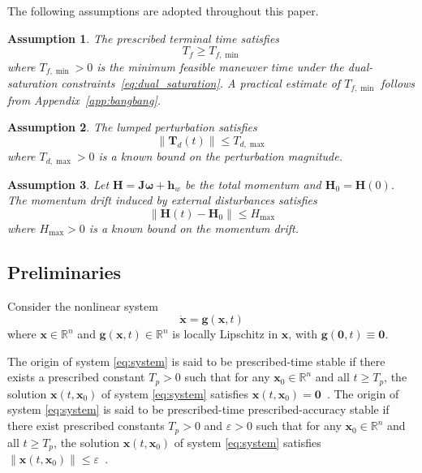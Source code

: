 \documentclass[journal]{new-aiaa}
\newtheorem{assumption}{Assumption}
\begin{document}
The following assumptions are adopted throughout this paper.

\begin{assumption}\label{ass:feasible_Tf}
The prescribed terminal time satisfies
\begin{equation}
T_f \ge T_{f,\min}
\label{eq:T_f_feasible}
\end{equation}
where $T_{f,\min}>0$ is the minimum feasible maneuver time under the dual-saturation constraints~\eqref{eq:dual_saturation}.
A practical estimate of $T_{f,\min}$ follows from Appendix~\ref{app:bangbang}.
\end{assumption}

\begin{assumption}\label{ass:disturbance_bound}
The lumped perturbation satisfies
\begin{equation}
\|\boldsymbol{T}_d(t)\| \le T_{d,\max}
\label{eq:Td_bound}
\end{equation}
where $T_{d,\max}>0$ is a known bound on the perturbation magnitude.
\end{assumption}

\begin{assumption}\label{ass:H_budget}
Let $\boldsymbol{H}=\boldsymbol{J}\boldsymbol{\omega}+\boldsymbol{h}_w$ be the total momentum and $\boldsymbol{H}_0=\boldsymbol{H}(0)$.
The momentum drift induced by external disturbances satisfies
\begin{equation}
\|\boldsymbol{H}(t)-\boldsymbol{H}_0\| \le H_{\max}
\label{eq:Hmax}
\end{equation}
where $H_{\max} > 0$ is a known bound on the momentum drift.
\end{assumption}

\subsection{Preliminaries}
Consider the nonlinear system
\begin{equation}
\dot{\boldsymbol{x}} = \boldsymbol{g}(\boldsymbol{x},t)
\label{eq:system}
\end{equation}
where $\boldsymbol{x}\in\mathbb{R}^n$ and $\boldsymbol{g}(\boldsymbol{x},t)\in\mathbb{R}^n$ is locally Lipschitz in $\boldsymbol{x}$, with $\boldsymbol{g}(\boldsymbol{0},t)\equiv\boldsymbol{0}$.

The origin of system \eqref{eq:system} is said to be prescribed-time stable if there exists a prescribed constant $T_p>0$ such that for any $\boldsymbol{x}_0\in\mathbb{R}^n$ and all $t\ge T_p$, the solution $\boldsymbol{x}(t,\boldsymbol{x}_0)$ of system \eqref{eq:system} satisfies $\boldsymbol{x}(t,\boldsymbol{x}_0)=\boldsymbol{0}$~\cite{sanchez-torres_predefined-time_2015}. The origin of system \eqref{eq:system} is said to be prescribed-time prescribed-accuracy stable if there exist prescribed constants $T_p>0$ and $\varepsilon>0$ such that for any $\boldsymbol{x}_0\in\mathbb{R}^n$ and all $t\ge T_p$, the solution $\boldsymbol{x}(t,\boldsymbol{x}_0)$ of system \eqref{eq:system} satisfies $\|\boldsymbol{x}(t,\boldsymbol{x}_0)\|\le\varepsilon$~\cite{xiao_scaling-transformation-based_2025}.
\end{document}

